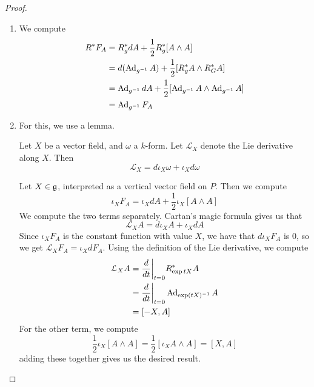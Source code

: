 \begin{proof} \enumbreak
\begin{enumerate}
  \item We compute
  \begin{align*}
  R^*F_A &= R^*_gdA + \frac{1}{2}R^*_g[A \wedge A] \\
  &= d(\operatorname{Ad}_{g^{-1}}A) + \frac{1}{2}[R^*_gA \wedge R^*_GA] \\
  &= \operatorname{Ad}_{g^{-1}}dA + \frac{1}{2}[\operatorname{Ad}_{g^{-1}}A \wedge \operatorname{Ad}_{g^{-1}}A] \\
  &= \operatorname{Ad}_{g^{-1}}F_A
  \end{align*}
  \item For this, we use a lemma.
  \begin{lem*}
  Let $X$ be a vector field, and $\omega$ a $k$-form. Let $\mathcal{L}_X$ denote
  the Lie derivative along $X$. Then
  \[
  \mathcal{L}_X = d\iota_X\omega + \iota_Xd\omega
  \]
  \end{lem*}
  Let $X \in \mathfrak{g}$, interpreted as a vertical vector field on $P$. Then
  we compute
  \[
  \iota_XF_A = \iota_XdA + \frac{1}{2}\iota_X[A \wedge A]
  \]
  We compute the two terms separately. Cartan's magic formula gives us that
  \[
  \mathcal{L}_XA = d\iota_XA + \iota_XdA
  \]
  Since $\iota_XF_A$ is the constant function with value $X$,
  we have that $d\iota_XF_A$ is $0$, so we get $\mathcal{L}_XF_A = \iota_XdF_A$.
  Using the definition of the Lie derivative, we compute
  \begin{align*}
  \mathcal{L}_XA &= \frac{d}{dt}\bigg\vert_{t=0}R^*_{\exp{tX}}A \\
  &= \frac{d}{dt}\bigg\vert_{t=0}\operatorname{Ad}_{\exp(tX)^{-1}}A  \\
  &= [-X, A]
  \end{align*}
  For the other term, we compute
  \[
  \frac{1}{2}\iota_X[A \wedge A] = \frac{1}{2}[\iota_XA \wedge A] = [X,A]
  \]
  adding these together gives us the desired result.
\end{enumerate}
\end{proof}
%